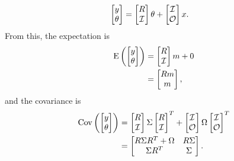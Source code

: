 \documentclass[letter, 10pt]{article}
\begin{document}
\begin{align*}
  \begin{bmatrix}
    y \\ \theta
  \end{bmatrix}
  &=
    \begin{bmatrix}
      R \\ \mathcal{I}
    \end{bmatrix} \theta +
  \begin{bmatrix}
    \mathcal{I} \\ \mathcal{O}
  \end{bmatrix} x.
\end{align*}
%
%
From this, the expectation is 
\begin{align*}
  \mathrm{E} 
  \left(
  \begin{bmatrix}
    y \\ \theta
  \end{bmatrix}
  \right)
  &=
    \begin{bmatrix}
      R \\ \mathcal{I}
    \end{bmatrix} m + 0 \\
  &= \begin{bmatrix}
      Rm \\ m
    \end{bmatrix} ,
\end{align*}
and the covariance is
\begin{align*}
  \mathrm{Cov} 
  \left(
  \begin{bmatrix}
    y \\ \theta
  \end{bmatrix}
  \right)
  &=
    \begin{bmatrix}
      R \\ \mathcal{I}
    \end{bmatrix} \Sigma
  \begin{bmatrix}
    R \\ \mathcal{I}
  \end{bmatrix}^T +
  \begin{bmatrix}
    \mathcal{I} \\ \mathcal{O}
  \end{bmatrix} \Omega
  \begin{bmatrix}
    \mathcal{I} \\ \mathcal{O}
  \end{bmatrix} ^T \\
  &=
    \begin{bmatrix}
      R \Sigma R^T + \Omega & R\Sigma \\
      \Sigma R^T & \Sigma
    \end{bmatrix}.
\end{align*}
\end{document}
